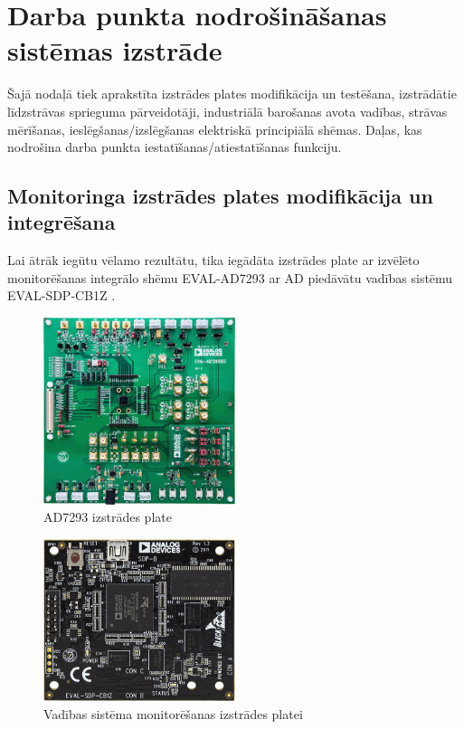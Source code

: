 \section{Darba punkta nodrošināšanas sistēmas izstrāde}
Šajā nodaļā tiek aprakstīta izstrādes plates modifikācija un testēšana, izstrādātie līdzstrāvas sprieguma pārveidotāji, industriālā barošanas avota vadības, strāvas mērīšanas, ieslēgšanas/izslēgšanas elektriskā principiālā shēmas. Daļas, kas nodrošina darba punkta iestatīšanas/atiestatīšanas funkciju.
\subsection{Monitoringa izstrādes plates modifikācija un integrēšana}
Lai ātrāk iegūtu vēlamo rezultātu, tika iegādāta izstrādes plate ar izvēlēto monitorēšanas integrālo shēmu EVAL-AD7293 \cite{eval_board} ar AD piedāvātu vadības sistēmu EVAL-SDP-CB1Z \cite{eval_board_mcu}.
\begin{figure}[H]
	\centering
    \includegraphics[width=0.5\textwidth]{pictures/EVAL-AD7293SDZ_TOP-web.png}\hspace{1cm}
    \caption{AD7293 izstrādes plate}
\end{figure}
\begin{figure}[H]
	\centering
    \includegraphics[width=0.5\textwidth]{pictures/EVAL-SDP-B-top-web.png}\hspace{1cm}
    \caption{Vadības sistēma monitorēšanas izstrādes platei}
\end{figure}
